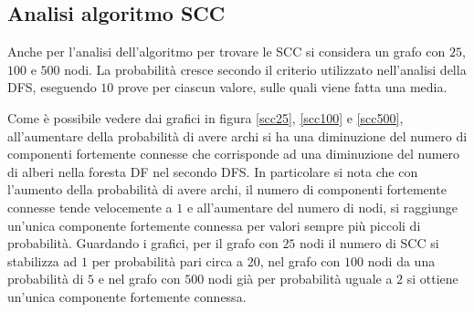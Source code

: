 \documentclass[11pt]{article}
\begin{document}
\subsection{Analisi algoritmo SCC}
Anche per l'analisi dell'algoritmo per trovare le SCC si considera un grafo con $25$, $100$ e $500$ nodi. La probabilità cresce secondo il criterio utilizzato nell'analisi della DFS, eseguendo $10$ prove per ciascun valore, sulle quali viene fatta una media.

Come è possibile vedere dai grafici in figura \ref{scc25}, \ref{scc100} e \ref{scc500}, all'aumentare della probabilità di avere archi si ha una diminuzione del numero di componenti fortemente connesse che corrisponde ad una diminuzione del numero di alberi nella foresta DF nel secondo DFS. In particolare si nota che con l'aumento della probabilità di avere archi, il numero di componenti fortemente connesse tende velocemente a $1$ e all'aumentare del numero di nodi, si raggiunge un'unica componente fortemente connessa per valori sempre più piccoli di probabilità. Guardando i grafici, per il grafo con $25$ nodi il numero di SCC si stabilizza ad $1$ per probabilità pari circa a $20$, nel grafo con $100$ nodi da una probabilità di $5$ e nel grafo con $500$ nodi già per probabilità uguale a $2$ si ottiene un'unica componente fortemente connessa.
\end{document}
